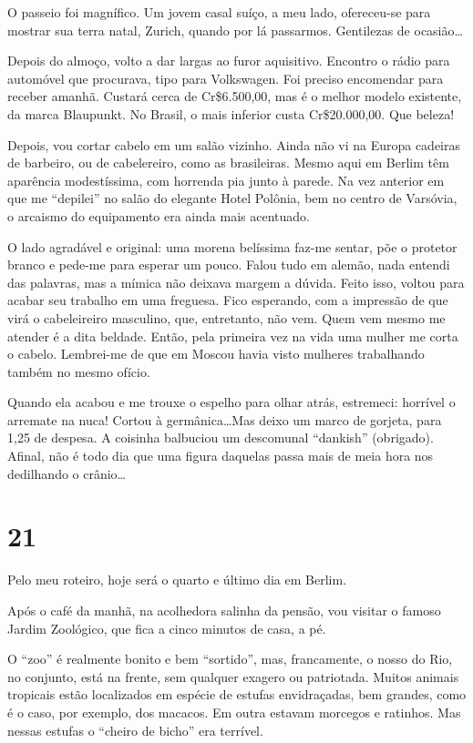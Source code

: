 O passeio foi magnífico. Um jovem casal suíço, a meu lado, ofereceu-se para mostrar sua terra natal, Zurich, quando por lá passarmos. Gentilezas de ocasião\ldots

Depois do almoço, volto a dar largas ao furor aquisitivo. Encontro o rádio para automóvel que procurava, tipo para Volkswagen. Foi preciso encomendar para receber amanhã. Custará cerca de Cr\$6.500,00, mas é o melhor modelo existente, da marca Blaupunkt. No Brasil, o mais inferior custa Cr\$20.000,00. Que beleza!

Depois, vou cortar cabelo em um salão vizinho. Ainda não vi na Europa cadeiras de barbeiro, ou de cabelereiro, como as brasileiras. Mesmo aqui em Berlim têm aparência modestíssima, com horrenda pia junto à parede. Na vez anterior em que me ``depilei'' no salão do elegante Hotel Polônia, bem no centro de Varsóvia, o arcaismo do equipamento era ainda mais acentuado.

O lado agradável e original: uma morena belíssima faz-me sentar, põe o protetor branco e pede-me para esperar um pouco. Falou tudo em alemão, nada entendi das palavras, mas a mímica não deixava margem a dúvida. Feito isso, voltou para acabar seu trabalho em uma freguesa. Fico esperando, com a impressão de que virá o cabeleireiro masculino, que, entretanto, não vem. Quem vem mesmo me atender é a dita beldade. Então, pela primeira vez na vida uma mulher me corta o cabelo. Lembrei-me de que em Moscou havia visto mulheres trabalhando também no mesmo ofício.

Quando ela acabou e me trouxe o espelho para olhar atrás, estremeci: horrível o arremate na nuca! Cortou à germânica\ldots Mas deixo um marco de gorjeta, para 1,25 de despesa. A coisinha balbuciou um descomunal ``dankish'' (obrigado). Afinal, não é todo dia que uma figura daquelas passa mais de meia hora nos dedilhando o crânio\ldots

\section*{21 \adfflatleafright {}}
Pelo meu roteiro, hoje será o quarto e último dia em Berlim.

Após o café da manhã, na acolhedora salinha da pensão, vou visitar o famoso Jardim Zoológico, que fica a cinco minutos de casa, a pé.

O ``zoo'' é realmente bonito e bem ``sortido'', mas, francamente, o nosso do Rio, no conjunto, está na frente, sem qualquer exagero ou patriotada. Muitos animais tropicais estão localizados em espécie de estufas envidraçadas, bem grandes, como é o caso, por exemplo, dos macacos. Em outra estavam morcegos e ratinhos. Mas nessas estufas o ``cheiro de bicho'' era terrível.


